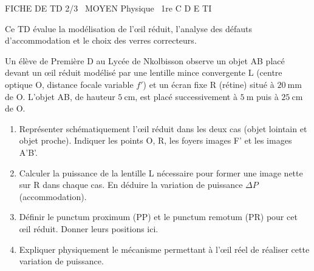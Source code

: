\documentclass[11pt]{article}
\begin{document}
\begin{tcolorbox}[enhanced,colback=popink,colframe=popink,arc=10pt,boxrule=0pt,left=12pt,right=12pt,top=9pt,bottom=9pt]
{\color{white}\popxbold\small FICHE DE TD 2/3 \textbullet\ MOYEN \hfill Physique \textbullet\ 1re C D E TI\par}
\end{tcolorbox}
\vspace{4pt}
Ce TD évalue la modélisation de l'œil réduit, l'analyse des défauts d'accommodation et le choix des verres correcteurs.

\begin{exercice}
Un élève de Première D au Lycée de Nkolbisson observe un objet AB placé devant un œil réduit modélisé par une lentille mince convergente L (centre optique O, distance focale variable $f'$) et un écran fixe R (rétine) situé à $\SI{20}{\milli\metre}$ de O. L'objet AB, de hauteur $\SI{5}{\centi\metre}$, est placé successivement à $\SI{5}{\metre}$ puis à $\SI{25}{\centi\metre}$ de O.
\begin{enumerate}
    \item Représenter schématiquement l'œil réduit dans les deux cas (objet lointain et objet proche). Indiquer les points O, R, les foyers images F' et les images A'B'.
    \item Calculer la puissance de la lentille L nécessaire pour former une image nette sur R dans chaque cas. En déduire la variation de puissance $\Delta P$ (accommodation).
    \item Définir le punctum proximum (PP) et le punctum remotum (PR) pour cet œil réduit. Donner leurs positions ici.
    \item Expliquer physiquement le mécanisme permettant à l'œil réel de réaliser cette variation de puissance.
\end{enumerate}
\end{exercice}
\end{document}
